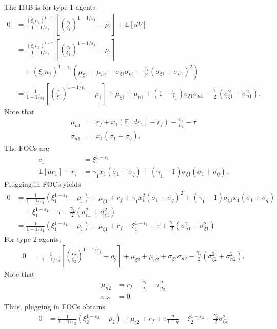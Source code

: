 \documentclass[12 pt, oneside]{article}
\theoremstyle{definition}
\theoremstyle{definition}
\theoremstyle{definition}
\newcommand{\E}{\mathbb{E}}
\begin{document}
The HJB is for type 1 agents
\begin{align*}
  0 & = \frac{(\xi_1 n_1)^{1-\gamma_1}}{1-1/\varepsilon_1}\left[\left(\frac{c_1}{\xi_1}\right)^{1-1/\varepsilon_1} - \rho_1\right] + \E[dV]\\
& =  \frac{(\xi_1 n_1)^{1-\gamma_1}}{1-1/\varepsilon_1}\left[\left(\frac{c_1}{\xi_1}\right)^{1-1/\varepsilon_1} - \rho_1\right] \\
&\quad + (\xi_1n_1)^{1-\gamma_1}\left(\mu_{\xi 1} + \mu_{n 1} + \sigma_{\xi 1} \sigma_{n1} - \frac{\gamma_1}{2}(\sigma_{\xi 1} + \sigma_{n1})^2 \right)\\
& =  \frac{1}{1-1/\varepsilon_1}\left[\left(\frac{c_1}{\xi_1}\right)^{1-1/\varepsilon_1} - \rho_1\right] + \mu_{\xi 1} + \mu_{n1} +(1-\gamma_1)\sigma_{\xi 1} \sigma_{n 1} - \frac{\gamma_1}{2}(\sigma_{\xi 1}^2 + \sigma_{n1}^2).
\end{align*}
Note that
\begin{align*}
  \mu_{n1} & = r_f + x_1(\E[dr_1] - r_f) - \frac{c_1}{n_1} - \tau\\
  \sigma_{n1} & = x_1(\sigma_1 + \sigma_q).
\end{align*}
The FOCs are
\begin{align*}
  c_1 & = \xi^{1-\varepsilon_1}\\
  \E[dr_1 ] - r_f & = \gamma_1x_1(\sigma_1+\sigma_q) +(\gamma_1-1) \sigma_{\xi 1} (\sigma_1+\sigma_q).
\end{align*}
Plugging in FOCs yields
\begin{align*}
  0 & = \frac{1}{1-1/\varepsilon_1}(\xi_1^{1-\varepsilon_1} - \rho_1) + \mu_{\xi 1} + r_f + \gamma_1x_1^2(\sigma_1+\sigma_q)^2 + (\gamma_1-1)\sigma_{\xi 1}x_1(\sigma_1+\sigma_q) \\
&\quad- \xi_1^{1-\varepsilon_1} - \tau - \frac{\gamma_1}{2}(\sigma_{n1}^2 + \sigma_{\xi 1}^2)\\
& = \frac{1}{1-1/\varepsilon_1}(\xi_1^{1-\varepsilon_1} - \rho_1) + \mu_{\xi 1} + r_f - \xi_1^{1-\varepsilon_1} - \tau + \frac{\gamma_1}{2}(\sigma_{n1}^2 -\sigma_{\xi 1}^2)
\end{align*}
For type 2 agents,
\begin{align*}
  0 & = \frac{1}{1-1/\varepsilon_2}\left[\left(\frac{c_2}{\xi_2}\right)^{1-1/\varepsilon_2} - \rho_2\right] + \mu_{\xi 2} + \mu_{n2} + \sigma_{\xi 2}\sigma_{n 2} - \frac{\gamma_2}{2}(\sigma_{\xi 2}^2 + \sigma_{n2}^2).
\end{align*}
Note that
\begin{align*}
  \mu_{n2} & = r_f - \frac{c_1}{n_1} + \tau \frac{n_1}{n_2} \\
  \sigma_{n2} & = 0.
\end{align*}
Thus, plugging in FOCs obtains
\begin{align*}
  0 & = \frac{1}{1-1/\varepsilon_2}(\xi_2^{1-\varepsilon_2} - \rho_2) + \mu_{\xi 2} + r_f  +\tau \frac{\eta}{1-\eta}-\xi_2^{1-\varepsilon_2} - \frac{\gamma_2}{2}\sigma_{\xi 2}^2
\end{align*}
\end{document}
